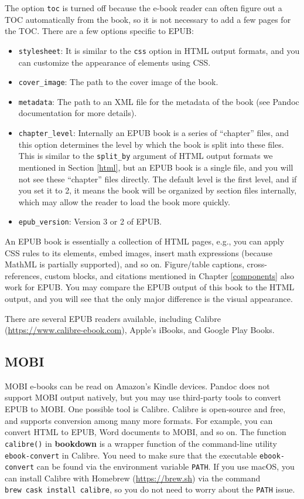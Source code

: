 \documentclass[
  12pt,
]{krantz}
\providecommand{\tightlist}{%
  \setlength{\itemsep}{0pt}\setlength{\parskip}{0pt}}
\theoremstyle{definition}
\theoremstyle{definition}
\theoremstyle{definition}
\theoremstyle{definition}
\theoremstyle{remark}
\begin{document}
The option \texttt{toc} is turned off because the e-book reader can often figure out a TOC automatically from the book, so it is not necessary to add a few pages for the TOC. There are a few options specific to EPUB:

\begin{itemize}
\tightlist
\item
  \texttt{stylesheet}: It is similar to the \texttt{css} option in HTML output formats, and you can customize the appearance of elements using CSS.
\item
  \texttt{cover\_image}: The path to the cover image of the book.
\item
  \texttt{metadata}: The path to an XML file for the metadata of the book (see Pandoc documentation for more details).
\item
  \texttt{chapter\_level}: Internally an EPUB book is a series of ``chapter'' files, and this option determines the level by which the book is split into these files. This is similar to the \texttt{split\_by} argument of HTML output formats we mentioned in Section \ref{html}, but an EPUB book is a single file, and you will not see these ``chapter'' files directly. The default level is the first level, and if you set it to 2, it means the book will be organized by section files internally, which may allow the reader to load the book more quickly.
\item
  \texttt{epub\_version}: Version 3 or 2 of EPUB.
\end{itemize}

An EPUB book is essentially a collection of HTML pages, e.g., you can apply CSS rules to its elements, embed images, insert math expressions (because MathML is partially supported), and so on. Figure/table captions, cross-references, custom blocks, and citations mentioned in Chapter \ref{components} also work for EPUB. You may compare the EPUB output of this book to the HTML output, and you will see that the only major difference is the visual appearance.

There are several EPUB readers available, including Calibre (\url{https://www.calibre-ebook.com}), Apple's iBooks, and Google Play Books.

\subsection{MOBI}\label{mobi}

MOBI e-books can be read on Amazon's Kindle devices. Pandoc does not support MOBI output natively, but you may use third-party tools to convert EPUB to MOBI. One possible tool is Calibre. Calibre is open-source and free, and supports conversion among many more formats. For example, you can convert HTML to EPUB, Word documents to MOBI, and so on. The function \texttt{calibre()} in \textbf{bookdown} is a wrapper function of the command-line utility \texttt{ebook-convert} in Calibre. You need to make sure that the executable \texttt{ebook-convert} can be found via the environment variable \texttt{PATH}. If you use macOS, you can install Calibre with Homebrew (\url{https://brew.sh}) via the command \texttt{brew\ cask\ install\ calibre}, so you do not need to worry about the \texttt{PATH} issue.
\end{document}
